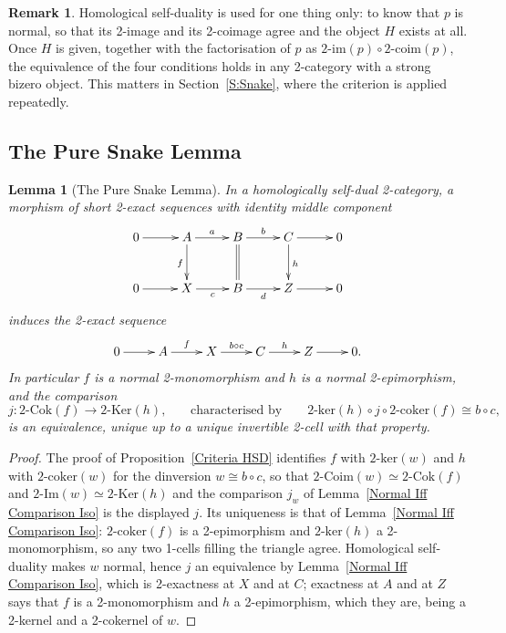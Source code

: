 \documentclass[reqno,a4paper]{amsart}
\numberwithin{equation}{section}
\theoremstyle{plain}
\newtheorem{lemma}[subsection]{Lemma}
\theoremstyle{definition}
\newtheorem{remark}[subsection]{Remark}
\def\nameit#1{\textrm{#1}~}
\def\prox{\nameit{Proposition}}
\def\lemx{\nameit{Lemma}}
\def\dfn#1{{\itshape #1}}
\newcommand{\comp}{\circ}
\newcommand{\iso}{\cong}
\renewcommand{\1}{\onecat{1}}
\newcommand{\TwoKer}{\ensuremath{2\text{-}\mathrm{Ker}}}
\newcommand{\TwoCoker}{\ensuremath{2\text{-}\mathrm{Cok}}}
\newcommand{\twoker}{\ensuremath{2\text{-}\mathrm{ker}}}
\newcommand{\twocoker}{\ensuremath{2\text{-}\mathrm{coker}}}
\newcommand{\TwoImg}{\ensuremath{2\text{-}\mathrm{Im}}}
\newcommand{\twoimg}{\ensuremath{2\text{-}\mathrm{im}}}
\newcommand{\TwoCoim}{\ensuremath{2\text{-}\mathrm{Coim}}}
\newcommand{\twocoim}{\ensuremath{2\text{-}\mathrm{coim}}}
\begin{document}
\begin{remark}\label{Rem Exactness Homology Cost}
	Homological self-duality is used for one thing only: to know that \(p\) is normal, so that its 2-image and its 2-coimage agree and the object \(H\) exists at all. Once \(H\) is given, together with the factorisation of \(p\) as \(\twoimg(p)\comp\twocoim(p)\), the equivalence of the four conditions holds in any 2-category with a strong bizero object. This matters in Section~\ref{S:Snake}, where the criterion is applied repeatedly.
\end{remark}

\subsection{The Pure Snake Lemma}\label{SS:PureSnake}

\begin{lemma}[The Pure Snake Lemma]\label{Pure Snake Lemma}
	In a homologically self-dual 2-category, a morphism of short 2-exact sequences with identity middle component
	\begin{equation*}
		\xymatrix@!0@=4em{
		0 \ar[r] & A \ar[d]_{f} \ar[r]^-{a} &
		B \ar@{=}[d] \ar[r]^-{b} &
		C \ar[d]^{h} \ar[r] &
		0 \\
		0 \ar[r] &
		X \ar[r]_-{c} &
		B \ar[r]_-{d} &
		Z \ar[r] & 0}
	\end{equation*}
	induces the 2-exact sequence
	\begin{equation*}
		\xymatrix{0 \ar[r] & A \ar[r]^-f & X \ar[r]^-{b\comp c} & C \ar[r]^-h & Z \ar[r] & 0\text{.}}
	\end{equation*}
	In particular \(f\) is a normal 2-monomorphism and \(h\) is a normal 2-epimorphism, and the \dfn{comparison}
	\[
		j\colon\TwoCoker(f)\longrightarrow\TwoKer(h)\text{,}
		\qquad\text{characterised by}\qquad
		\twoker(h)\comp j\comp\twocoker(f)\iso b\comp c\text{,}
	\]
	is an equivalence, unique up to a unique invertible 2-cell with that property.
\end{lemma}
\begin{proof}
	The proof of \prox\ref{Criteria HSD} identifies \(f\) with \(\twoker(w)\) and \(h\) with \(\twocoker(w)\) for the dinversion \(w\iso b\comp c\), so that \(\TwoCoim(w)\simeq\TwoCoker(f)\) and \(\TwoImg(w)\simeq\TwoKer(h)\) and the comparison \(j_w\) of \lemx\ref{Normal Iff Comparison Iso} is the displayed \(j\). Its uniqueness is that of \lemx\ref{Normal Iff Comparison Iso}: \(\twocoker(f)\) is a 2-epimorphism and \(\twoker(h)\) a 2-monomorphism, so any two 1-cells filling the triangle agree. Homological self-duality makes \(w\) normal, hence \(j\) an equivalence by \lemx\ref{Normal Iff Comparison Iso}, which is 2-exactness at \(X\) and at \(C\); exactness at \(A\) and at \(Z\) says that \(f\) is a 2-monomorphism and \(h\) a 2-epimorphism, which they are, being a 2-kernel and a 2-cokernel of \(w\).
\end{proof}
\end{document}
